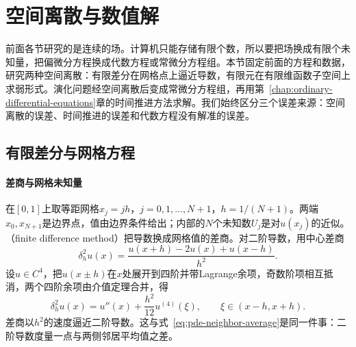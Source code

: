 
\section{空间离散与数值解}
\label{sec:pde-discretization}

前面各节研究的是连续的场。计算机只能存储有限个数，所以要把场换成有限个未知量，把偏微分方程换成代数方程或常微分方程组。本节固定前面的方程和数据，研究两种空间离散：有限差分在网格点上逼近导数，有限元在有限维函数子空间上求弱形式。演化问题经空间离散后变成常微分方程组，再用第~\ref{chap:ordinary-differential-equations}章的时间推进方法求解。我们始终区分三个误差来源：空间离散的误差、时间推进的误差和代数方程没有解准的误差。

\subsection{有限差分与网格方程}
\label{sec:pde-finite-difference}

\paragraph{差商与网格未知量}
在$[0,1]$上取等距网格$x_j=jh$，$j=0,1,\ldots,N+1$，$h=1/(N+1)$。两端$x_0,x_{N+1}$是边界点，值由边界条件给出；内部的$N$个未知数$U_j$是对$u(x_j)$的近似。（finite difference method）把导数换成网格值的差商。对二阶导数，用中心差商
\[
  \delta_h^2u(x)=\frac{u(x+h)-2u(x)+u(x-h)}{h^2} .
\]
设$u\in C^4$，把$u(x\pm h)$在$x$处展开到四阶并带Lagrange余项，奇数阶项相互抵消，两个四阶余项由介值定理合并，得
\begin{equation}
  \delta_h^2u(x)=u''(x)+\frac{h^2}{12}u^{(4)}(\xi),\qquad\xi\in(x-h,x+h).
  \label{eq:pde-central-difference}
\end{equation}
差商以$h^2$的速度逼近二阶导数。这与式~\eqref{eq:pde-neighbor-average}是同一件事：二阶导数度量一点与两侧邻居平均值之差。


